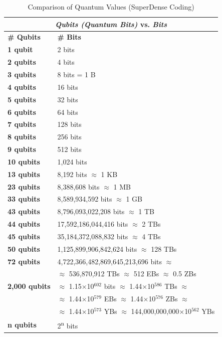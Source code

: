 \documentclass[conference]{IEEEtran}
\begin{document}
\begin{table}[!hp]
\centering
    \caption{Comparison of Quantum Values (SuperDense Coding)}
    \begin{tabular}{ |p{1.6cm}|p{6.2cm}| }
     \hline
     \multicolumn{2}{|c|}{\textbf{\textit{Qubits (Quantum Bits)} vs. \textit{Bits}}} \\
     \hline
     \hline
     \textbf{\# Qubits} & \textbf{\# Bits}\\
     \hline
     \hline
     \textbf{1 qubit} & 2 bits \\
     \hline
     \textbf{2 qubits} & 4 bits \\
     \hline
     \textbf{3 qubits} & 8 bits = 1 B \\
     \hline
     \textbf{4 qubits} & 16 bits \\
     \hline
     \textbf{5 qubits} & 32 bits \\
     \hline
     \textbf{6 qubits} & 64 bits \\
     \hline
     \textbf{7 qubits} & 128 bits \\
     \hline
     \textbf{8 qubits} & 256 bits \\
     \hline
     \textbf{9 qubits} & 512 bits \\
     \hline
     \textbf{10 qubits} & 1,024 bits \\
     \hline
     \textbf{13 qubits} & 8,192 bits $\approx$ 1 KB \\
     \hline
     \textbf{23 qubits} & 8,388,608 bits $\approx$ 1 MB \\
     \hline
     \textbf{33 qubits} & 8,589,934,592 bits $\approx$ 1 GB \\
     \hline
     \textbf{43 qubits} & 8,796,093,022,208 bits $\approx$ 1 TB \\
     \hline
     \textbf{44 qubits} & 17,592,186,044,416 bits $\approx$ 2 TBs \\
     \hline
     \textbf{45 qubits} & 35,184,372,088,832 bits $\approx$ 4 TBs \\
     \hline
     \textbf{50 qubits} & 1,125,899,906,842,624 bits $\approx$ 128 TBs \\
     \hline
     \hline
     \textbf{72 qubits} & 4,722,366,482,869,645,213,696 bits $\approx$ \\ & 
     $\approx$ 536,870,912 TBs $\approx$ 512 EBs $\approx$ 0.5 ZBs \\
     \hline
     \textbf{2,000 qubits} & $\approx$ 1.15$\times$10$^{602}$ ‬bits $\approx$ 1.44$\times$10$^{586}$ TBs $\approx$ \\ & $\approx$ 1.44$\times$10$^{579}$ EBs $\approx$ 1.44$\times$10$^{576}$ ZBs $\approx$ \\ & $\approx$ 1.44$\times$10$^{573}$ YBs $\approx$ 144,000,000,000$\times$10$^{562}$ YBs\\
     \hline
     \hline
     \textbf{n qubits} & 2\textsuperscript{n} bits \\
     \hline
    \end{tabular}
\end{table}
\end{document}
